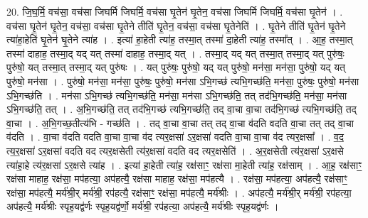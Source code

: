 \documentclass[17pt]{extarticle}
\begin{document}
20. जि॒घ॒र्मि॒ वच॑सा॒ वच॑सा जिघर्मि जिघर्मि॒ वच॑सा घृ॒तेन॑ घृ॒तेन॒ वच॑सा जिघर्मि जिघर्मि॒ वच॑सा घृ॒तेन॑ । . वच॑सा घृ॒तेन॑ घृ॒तेन॒ वच॑सा॒ वच॑सा घृ॒तेने तीति॑ घृ॒तेन॒ वच॑सा॒ वच॑सा घृ॒तेनेति॑ । . घृ॒तेने तीति॑ घृ॒तेन॑ घृ॒तेने त्या॑हा॒हेति॑ घृ॒तेन॑ घृ॒तेने त्या॑ह । . इत्या॑ हा॒हेती त्या॑ह॒ तस्मा॒त् तस्मा॑ दा॒हेती त्या॑ह॒ तस्मा᳚त् । . आ॒ह॒ तस्मा॒त् तस्मा॑ दाहाह॒ तस्मा॒द् यद् यत् तस्मा॑ दाहाह॒ तस्मा॒द् यत् । . तस्मा॒द् यद् यत् तस्मा॒त् तस्मा॒द् यत् पुरु॑षः॒ पुरु॑षो॒ यत् तस्मा॒त् तस्मा॒द् यत् पुरु॑षः । . यत् पुरु॑षः॒ पुरु॑षो॒ यद् यत् पुरु॑षो॒ मन॑सा॒ मन॑सा॒ पुरु॑षो॒ यद् यत् पुरु॑षो॒ मन॑सा । . पुरु॑षो॒ मन॑सा॒ मन॑सा॒ पुरु॑षः॒ पुरु॑षो॒ मन॑सा ऽभि॒गच्छ॑ त्यभि॒गच्छ॑ति॒ मन॑सा॒ पुरु॑षः॒ पुरु॑षो॒ मन॑सा ऽभि॒गच्छ॑ति । . मन॑सा ऽभि॒गच्छ॑ त्यभि॒गच्छ॑ति॒ मन॑सा॒ मन॑सा ऽभि॒गच्छ॑ति॒ तत् तद॑भि॒गच्छ॑ति॒ मन॑सा॒ मन॑सा ऽभि॒गच्छ॑ति॒ तत् । . अ॒भि॒गच्छ॑ति॒ तत् तद॑भि॒गच्छ॑ त्यभि॒गच्छ॑ति॒ तद् वा॒चा वा॒चा तद॑भि॒गच्छ॑ त्यभि॒गच्छ॑ति॒ तद् वा॒चा । . अ॒भि॒गच्छ॒तीत्य॑भि - गच्छ॑ति । . तद् वा॒चा वा॒चा तत् तद् वा॒चा व॑दति वदति वा॒चा तत् तद् वा॒चा व॑दति । . वा॒चा व॑दति वदति वा॒चा वा॒चा व॑द त्यर॒क्षसा॑ ऽर॒क्षसा॑ वदति वा॒चा वा॒चा व॑द त्यर॒क्षसा᳚ । . व॒द॒ त्य॒र॒क्षसा॑ ऽर॒क्षसा॑ वदति वद त्यर॒क्षसेती त्य॑र॒क्षसा॑ वदति वद त्यर॒क्षसेति॑ । . अ॒र॒क्षसेती त्य॑र॒क्षसा॑ ऽर॒क्षसे त्या॑हा॒हे त्य॑र॒क्षसा॑ ऽर॒क्षसे त्या॑ह । . इत्या॑ हा॒हेती त्या॑ह॒ रक्ष॑साꣳ॒॒ रक्ष॑सा मा॒हेती त्या॑ह॒ रक्ष॑साम् । . आ॒ह॒ रक्ष॑साꣳ॒॒ रक्ष॑सा माहाह॒ रक्ष॑सा॒ मप॑हत्या॒ अप॑हत्यै॒ रक्ष॑सा माहाह॒ रक्ष॑सा॒ मप॑हत्यै । . रक्ष॑सा॒ मप॑हत्या॒ अप॑हत्यै॒ रक्ष॑साꣳ॒॒ रक्ष॑सा॒ मप॑हत्यै॒ मर्य॑श्री॒र् मर्य॑श्री॒ रप॑हत्यै॒ रक्ष॑साꣳ॒॒ रक्ष॑सा॒ मप॑हत्यै॒ मर्य॑श्रीः । . अप॑हत्यै॒ मर्य॑श्री॒र् मर्य॑श्री॒ रप॑हत्या॒ अप॑हत्यै॒ मर्य॑श्रीः स्पृह॒यद्व॑र्णः स्पृह॒यद्व॑र्णो॒ मर्य॑श्री॒ रप॑हत्या॒ अप॑हत्यै॒ मर्य॑श्रीः स्पृह॒यद्व॑र्णः । \newline
\end{document}
